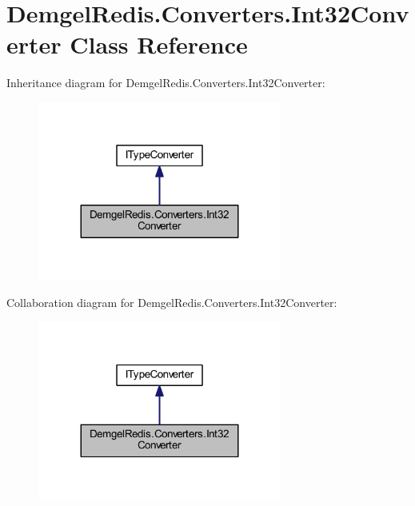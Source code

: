 \hypertarget{class_demgel_redis_1_1_converters_1_1_int32_converter}{}\section{Demgel\+Redis.\+Converters.\+Int32\+Converter Class Reference}
\label{class_demgel_redis_1_1_converters_1_1_int32_converter}


Inheritance diagram for Demgel\+Redis.\+Converters.\+Int32\+Converter\+:
\nopagebreak
\begin{figure}[H]
\begin{center}
\leavevmode
\includegraphics[width=227pt]{class_demgel_redis_1_1_converters_1_1_int32_converter__inherit__graph}
\end{center}
\end{figure}


Collaboration diagram for Demgel\+Redis.\+Converters.\+Int32\+Converter\+:
\nopagebreak
\begin{figure}[H]
\begin{center}
\leavevmode
\includegraphics[width=227pt]{class_demgel_redis_1_1_converters_1_1_int32_converter__coll__graph}
\end{center}
\end{figure}
